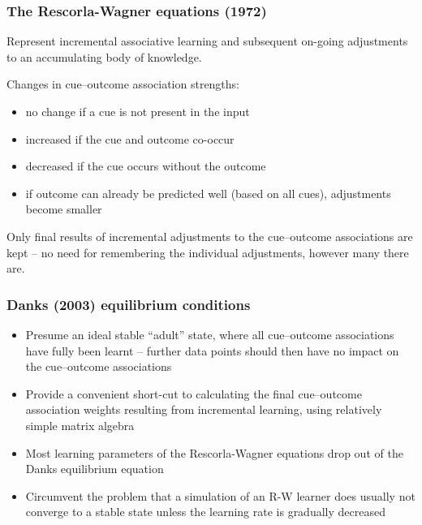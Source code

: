 \documentclass[t]{beamer} %
\begin{document}
\begin{frame}
  \frametitle{The Rescorla-Wagner equations (1972)}

  Represent incremental associative learning and subsequent on-going
  adjustments to an accumulating body of knowledge.

  \gap[1]
  Changes in cue--outcome association strengths:
  \begin{itemize}
  \item no change if a cue is not present in the input
  \item increased if the cue and outcome co-occur
  \item decreased if the cue occurs without the outcome
  \item if outcome can already be predicted well (based on all cues),
    adjustments become smaller
  \end{itemize}

  \gap[1] 
  Only final results of incremental adjustments to the cue--outcome associations are
  kept -- no need for remembering the individual adjustments, however many
  there are.
\end{frame}

\begin{frame}
  \frametitle{Danks (2003) equilibrium conditions} 

  \begin{itemize}
  \item Presume an ideal stable ``adult'' state, where all cue--outcome
    associations have fully been learnt -- further data points should then
    have no impact on the cue--outcome associations
  \item Provide a convenient short-cut to calculating the final cue--outcome
    association weights resulting from incremental learning, using relatively
    simple matrix algebra
  \item Most learning parameters of the Rescorla-Wagner equations drop
    out of the Danks equilibrium equation
  \item Circumvent the problem that a simulation of an R-W learner does
    usually not converge to a stable state unless the learning rate is
    gradually decreased
  \end{itemize}
\end{frame}
\end{document}
